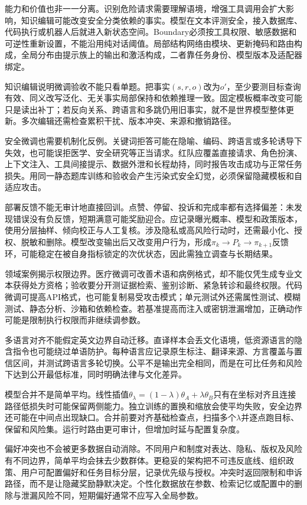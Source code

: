 能力和价值也非一一分离。识别危险请求需要理解语境，增强工具调用会扩大影响，知识编辑可能改变安全分类依赖的事实。模型在文本评测安全，接入数据库、代码执行或机器人后就进入新状态空间。Boundary必须按工具权限、敏感数据和可逆性重新设置，不能沿用纯对话阈值。局部结构网络由模块、更新掩码和路由构成，全局分布由提示族上的输出和激活构成，二者靠任务身份、模型版本及适配器绑定。

知识编辑说明微调验收不能只看单题。把事实$(s,r,o)$改为$o'$，至少要测目标查询有效、同义改写泛化、无关事实局部保持和依赖推理一致。固定模板概率改变可能只是读出补丁；若反向关系、跨语言和多跳仍用旧事实，就不是世界模型整体更新。多次编辑还需检查累积干扰、版本冲突、来源和撤销路径。

安全微调也需要机制化反例。关键词拒答可能在隐喻、编码、跨语言或多轮诱导下失效，也可能误拒医学、安全研究等正当请求。红队应覆盖直接请求、角色扮演、上下文注入、工具间接提示、数据外泄和长程劫持，同时报告攻击成功与正常任务损失。用同一静态题库训练和验收会产生污染式安全幻觉，必须保留隐藏模板和自适应攻击。

部署反馈不能无审计地直接回训。点赞、停留、投诉和完成率都有选择偏差：未发现错误没有负反馈，短期满意可能奖励迎合。应记录曝光概率、模型和政策版本，使用分层抽样、倾向校正与人工复核。涉及隐私或高风险行动时，还需最小化、授权、脱敏和删除。模型改变输出后又改变用户行为，形成$\pi_k\to P_k\to\pi_{k+1}$反馈环，可能稳定在被自身指标锁定的次优状态，因此需独立调查与长期结果。

领域案例揭示权限边界。医疗微调可改善术语和病例格式，却不能仅凭生成专业文本获得处方资格；验收要分开测证据检索、鉴别诊断、紧急转诊和最终权限。代码微调可提高API格式，也可能复制易受攻击模式；单元测试外还需属性测试、模糊测试、静态分析、沙箱和依赖检查。若基准提高而注入或密钥泄漏增加，正确动作可能是限制执行权限而非继续调参数。

多语言对齐不能假定英文边界自动迁移。直译样本会丢文化语境，低资源语言的隐含指令也可能绕过单语防护。每种语言应记录原生标注、翻译来源、方言覆盖与置信区间，并测试跨语言多轮切换。公平不是输出完全相同，而是在可比任务和风险下达到公开最低标准，同时明确法律与文化差异。

模型合并不是简单平均。线性插值$\theta_\lambda=(1-\lambda)\theta_A+\lambda\theta_B$只有在坐标对齐且连接路径低损失时可能保留两侧能力。独立训练的置换和缩放会使平均失败，安全边界还可能在中间点出现缺口。合并前要对齐基础检查点，扫描多个$\lambda$并逐点跑目标、保留和风险集。运行时路由更可审计，但增加时延与配置复杂度。

偏好冲突也不会被更多数据自动消除。不同用户和制度对表达、隐私、版权及风险有不同边界，简单平均会抹去少数群体。更稳妥的架构把不可违反底线、组织政策、用户可配置偏好和任务目标分层，记录优先级与授权。冲突时返回限制和申诉路径，而不是让隐藏奖励静默决定。个性化数据放在参数、检索记忆或配置中的删除与泄漏风险不同，短期偏好通常不应写入全局参数。

